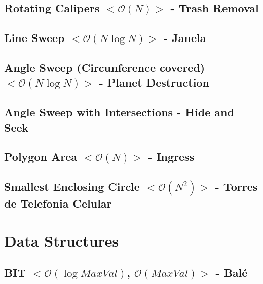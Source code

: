\documentclass[11pt, a4paper, twoside, notitlepage]{article}
\begin{document}
\subsection{Rotating Calipers $<\mathcal{O}(N)>$ - Trash Removal}



\subsection{Line Sweep $<\mathcal{O}(N\log N)>$ - Janela}



\subsection{Angle Sweep (Circunference covered) $<\mathcal{O}(N\log N)>$ - Planet Destruction}



\subsection{Angle Sweep with Intersections - Hide and Seek}



\subsection{Polygon Area $<\mathcal{O}(N)>$ - Ingress}



\subsection{Smallest Enclosing Circle $<\mathcal{O}(N^{2})>$ - Torres de Telefonia Celular}



\newpage

\section{Data Structures}

\subsection{BIT $<\mathcal{O}(\log MaxVal)$, $\mathcal{O}(MaxVal)>$ - Balé}
\end{document}
